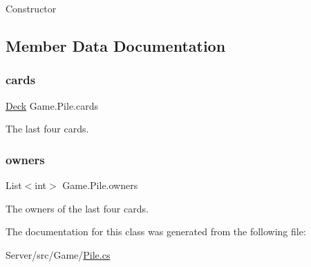 Constructor 

\subsection{Member Data Documentation}
\mbox{\label{class_game_1_1_pile_a487d2e8b498fadfc9046656146c41819}} 
\subsubsection{\texorpdfstring{cards}{cards}}
{\footnotesize\ttfamily \hyperlink{class_game_1_1_deck}{Deck} Game.\+Pile.\+cards}

The last four cards. \mbox{\label{class_game_1_1_pile_a0d49178f9402aa7e51101d1d183c1a1d}} 
\subsubsection{\texorpdfstring{owners}{owners}}
{\footnotesize\ttfamily List$<$int$>$ Game.\+Pile.\+owners}

The owners of the last four cards. 

The documentation for this class was generated from the following file\+:\begin{DoxyCompactItemize}
\item 
Server/src/\+Game/\hyperlink{_pile_8cs}{Pile.\+cs}\end{DoxyCompactItemize}
